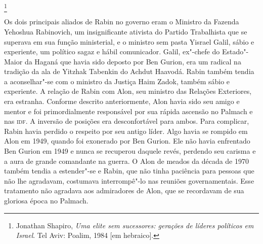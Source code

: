 \footnote{Jonathan Shapiro, \textit{Uma elite sem sucessores: gerações de líderes políticos em Israel}. Tel Aviv: Poalim, 1984 {[}em hebraico{]}.}

Os dois principais aliados de Rabin no governo eram o Ministro da
Fazenda Yehoshua Rabinovich, um insignificante ativista do Partido
Trabalhista que se superava em sua função ministerial, e o ministro sem
pasta Yisrael Galil, sábio e experiente, um político sagaz e hábil
comunicador. Galil, ex"-chefe do Estado"-Maior da Haganá que havia sido
deposto por Ben Gurion, era um radical na tradição da ala de Yitzhak
Tabenkin do Achdut Haavodá. Rabin também tendia a aconselhar"-se com o
ministro da Justiça Haim Zadok, também sábio e experiente. A relação de
Rabin com Alon, seu ministro das Relações Exteriores, era estranha.
Conforme descrito anteriormente, Alon havia sido seu amigo e mentor e
foi primordialmente responsável por sua rápida ascensão no Palmach e nas
\textsc{idf}. A inversão de posições era desconfortável para ambos. Para
complicar, Rabin havia perdido o respeito por seu antigo líder. Algo
havia se rompido em Alon em 1949, quando foi exonerado por Ben Gurion.
Ele não havia enfrentado Ben Gurion em 1949 e nunca se recuperou daquele
revés, perdendo seu carisma e a aura de grande comandante na guerra. O
Alon de meados da década de 1970 também tendia a estender"-se e Rabin,
que não tinha paciência para pessoas que não lhe agradavam, costumava
interrompê"-lo nas reuniões governamentais. Esse tratamento não agradava
aos admiradores de Alon, que se recordavam de sua gloriosa época no Palmach.

